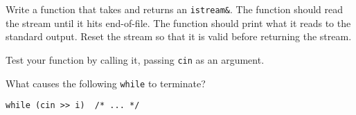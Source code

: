 %
%
\begin{question}\label{qst:function that takes and returns an istream}
Write a function that takes and returns an \verb|istream&|. The
function should read the stream until it hits end-of-file. The function should
print what it reads to the standard output. Reset the stream so that it is valid
before returning the stream.
\end{question}

\begin{question}
Test your function by calling it, passing \verb|cin| as an argument.
\end{question}

\begin{question}
What causes the following \verb|while| to terminate?
\begin{lstlisting}
while (cin >> i)  /* ... */
\end{lstlisting}
\end{question}
